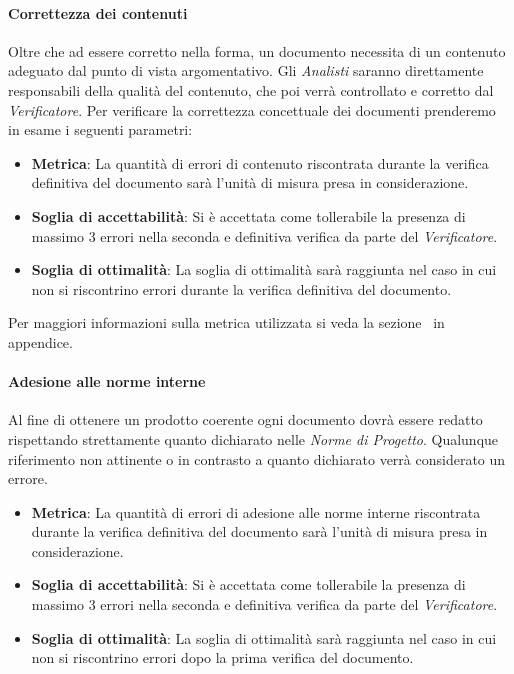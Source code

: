 \paragraph{Correttezza dei contenuti}
Oltre che ad essere corretto nella forma, un documento necessita di un contenuto adeguato dal punto di vista argomentativo. Gli \emph{Analisti} saranno direttamente responsabili della qualità del contenuto, che poi verrà controllato e corretto dal \emph{Verificatore}.
Per verificare la correttezza concettuale dei documenti prenderemo in esame i seguenti parametri:
\begin{itemize}
	\item \textbf{Metrica}: La quantità di errori di contenuto riscontrata durante la verifica definitiva del documento sarà l'unità di misura presa in considerazione.
	\item \textbf{Soglia di accettabilità}: Si è accettata come tollerabile la presenza di massimo 3 errori nella seconda e definitiva verifica da parte del \emph{Verificatore}.
	\item \textbf{Soglia di ottimalità}: La soglia di ottimalità sarà raggiunta nel caso in cui non si riscontrino errori durante la verifica definitiva del documento.
\end{itemize}

Per maggiori informazioni sulla metrica utilizzata si veda la sezione~ in appendice.

\paragraph{Adesione alle norme interne}
Al fine di ottenere un prodotto coerente ogni documento dovrà essere redatto rispettando strettamente quanto dichiarato nelle \emph{Norme di Progetto}.
Qualunque riferimento non attinente o in contrasto a quanto dichiarato verrà considerato un errore.
\begin{itemize}
	\item \textbf{Metrica}: La quantità di errori di adesione alle norme interne riscontrata durante la verifica definitiva del documento sarà l'unità di misura presa in considerazione. 
	\item \textbf{Soglia di accettabilità}: Si è accettata come tollerabile la presenza di massimo 3 errori nella seconda e definitiva verifica da parte del \emph{Verificatore}.
	\item \textbf{Soglia di ottimalità}: La soglia di ottimalità sarà raggiunta nel caso in cui non si riscontrino errori dopo la prima verifica del documento.
\end{itemize}

